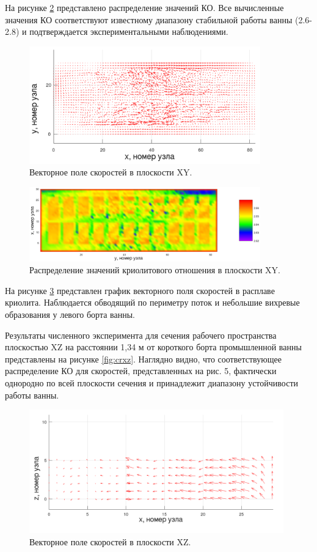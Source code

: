 \documentclass[]{pmi}
\begin{document}
На рисунке \ref{fig:crxy} представлено распределение значений КО. Все вычисленные значения КО соответствуют известному диапазону стабильной работы ванны (2.6-2.8) и подтверждается экспериментальными наблюдениями. 

\begin{figure}[H]
    \centering
    \includegraphics[width=100mm]{veloxy_art.png}
    \caption{Векторное поле скоростей в плоскости XY.}
    \label{fig:veloxy} 
\end{figure}

\begin{figure}[H]
    \centering
    \includegraphics[width=100mm]{crxy_art.png}
    \caption{Распределение значений криолитового отношения в плоскости XY.}
    \label{fig:crxy} 
\end{figure}

На рисунке \ref{fig:veloxz} представлен график векторного поля скоростей в расплаве криолита. Наблюдается обводящий по периметру поток и небольшие вихревые образования у левого борта ванны.

Результаты численного эксперимента для сечения рабочего пространства плоскостью XZ на расстоянии 1,34 м от короткого борта промышленной ванны представлены на рисунке \ref{fig:crxz}. Наглядно видно, что соответствующее распределение КО для скоростей, представленных на рис. 5, фактически однородно по всей плоскости сечения и принадлежит диапазону устойчивости работы ванны. 

\begin{figure}[H]
    \centering
    \includegraphics[width=110mm]{veloxz_art.png}
    \caption{Векторное поле скоростей в плоскости XZ.}
    \label{fig:veloxz} 
\end{figure}
\end{document}
